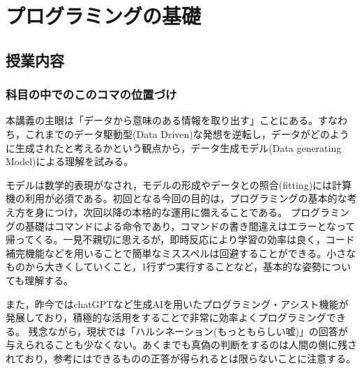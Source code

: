 \section{プログラミングの基礎}
\subsection{授業内容}
\subsubsection{科目の中でのこのコマの位置づけ}

本講義の主眼は「データから意味のある情報を取り出す」ことにある。すなわち，これまでのデータ駆動型(Data Driven)な発想を逆転し，データがどのように生成されたと考えるかという観点から，データ生成モデル(Data generating Model)による理解を試みる。

モデルは数学的表現がなされ，モデルの形成やデータとの照合(fitting)には計算機の利用が必須である。初回となる今回の目的は，プログラミングの基本的な考え方を身につけ，次回以降の本格的な運用に備えることである。
プログラミングの基礎はコマンドによる命令であり，コマンドの書き間違えはエラーとなって帰ってくる。一見不親切に思えるが，即時反応により学習の効率は良く，コード補完機能などを用いることで簡単なミススペルは回避することができる。小さなものから大きくしていくこと，1行ずつ実行することなど，基本的な姿勢についても理解する。

また，昨今ではchatGPTなど生成AIを用いたプログラミング・アシスト機能が発展しており，積極的な活用をすることで非常に効率よくプログラミングできる。
残念ながら，現状では「ハルシネーション(もっともらしい嘘)」の回答が与えられることも少なくない。あくまでも真偽の判断をするのは人間の側に残されており，参考にはできるものの正答が得られるとは限らないことに注意する。

